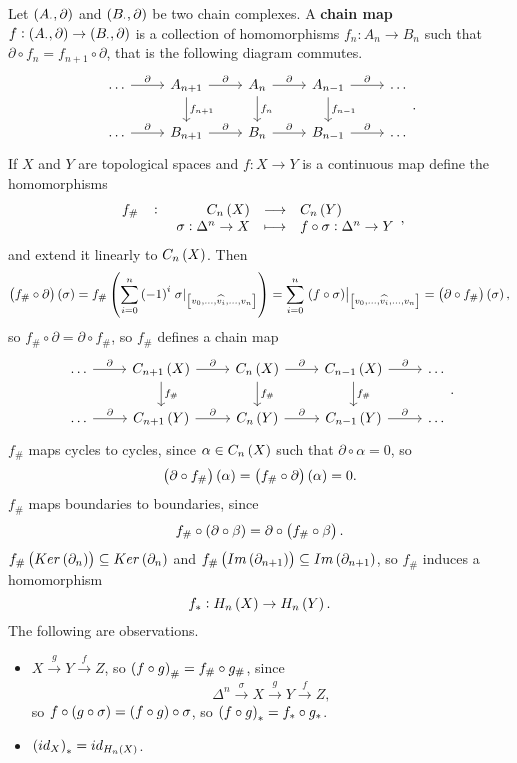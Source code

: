 Let $ \br{A_\cdot, \partial} $ and $ \br{B_\cdot, \partial} $ be two chain complexes. A \textbf{chain map} $ f : \br{A_\cdot, \partial} \to \br{B_\cdot, \partial} $ is a collection of homomorphisms $ f_n : A_n \to B_n $ such that $ \partial \circ f_n = f_{n + 1} \circ \partial $, that is the following diagram commutes.
$$
\begin{tikzcd}
\dots \arrow{r}{\partial} & A_{n + 1} \arrow{r}{\partial} \arrow{d}{f_{n + 1}} & A_n \arrow{r}{\partial} \arrow{d}{f_n} & A_{n - 1} \arrow{r}{\partial} \arrow{d}{f_{n - 1}} & \dots \\
\dots \arrow{r}{\partial} & B_{n + 1} \arrow{r}{\partial} & B_n \arrow{r}{\partial} & B_{n - 1} \arrow{r}{\partial} & \dots
\end{tikzcd}.
$$
If $ X $ and $ Y $ are topological spaces and $ f : X \to Y $ is a continuous map define the homomorphisms
$$ \function[f_\#]{C_n\br{X}}{C_n\br{Y}}{\sigma : \Delta^n \to X}{f \circ \sigma : \Delta^n \to Y}, $$
and extend it linearly to $ C_n\br{X} $. Then
$$ \br{f_\# \circ \partial}\br{\sigma} = f_\#\br{\sum_{i = 0}^n \br{-1}^i\eval{\sigma}_{\sbr{v_0, \dots, \widehat{v_i}, \dots, v_n}}} = \sum_{i = 0}^n \eval{\br{f \circ \sigma}}_{\sbr{v_0, \dots, \widehat{v_i}, \dots, v_n}} = \br{\partial \circ f_\#}\br{\sigma}, $$
so $ f_\# \circ \partial = \partial \circ f_\# $, so $ f_\# $ defines a chain map
$$
\begin{tikzcd}
\dots \arrow{r}{\partial} & C_{n + 1}\br{X} \arrow{r}{\partial} \arrow{d}{f_\#} & C_n\br{X} \arrow{r}{\partial} \arrow{d}{f_\#} & C_{n - 1}\br{X} \arrow{r}{\partial} \arrow{d}{f_\#} & \dots \\
\dots \arrow{r}{\partial} & C_{n + 1}\br{Y} \arrow{r}{\partial} & C_n\br{Y} \arrow{r}{\partial} & C_{n - 1}\br{Y} \arrow{r}{\partial} & \dots
\end{tikzcd}.
$$
$ f_\# $ maps cycles to cycles, since $ \alpha \in C_n\br{X} $ such that $ \partial \circ \alpha = 0 $, so
$$ \br{\partial \circ f_\#}\br{\alpha} = \br{f_\# \circ \partial}\br{\alpha} = 0. $$
$ f_\# $ maps boundaries to boundaries, since
$$ f_\# \circ \br{\partial \circ \beta} = \partial \circ \br{f_\# \circ \beta}. $$
$ f_\#\br{Ker\br{\partial_n}} \subseteq Ker\br{\partial_n} $ and $ f_\#\br{Im\br{\partial_{n + 1}}} \subseteq Im\br{\partial_{n + 1}} $, so $ f_\# $ induces a homomorphism
$$ f_* : H_n\br{X} \to H_n\br{Y}. $$
The following are observations.
\begin{itemize}
\item $ X \xrightarrow{g} Y \xrightarrow{f} Z $, so $ \br{f \circ g}_\# = f_\# \circ g_\# $, since
$$ \Delta^n \xrightarrow{\sigma} X \xrightarrow{g} Y \xrightarrow{f} Z, $$
so $ f \circ \br{g \circ \sigma} = \br{f \circ g} \circ \sigma $, so $ \br{f \circ g}_* = f_* \circ g_* $.
\item $ \br{id_X}_* = id_{H_n\br{X}} $.
\end{itemize}

